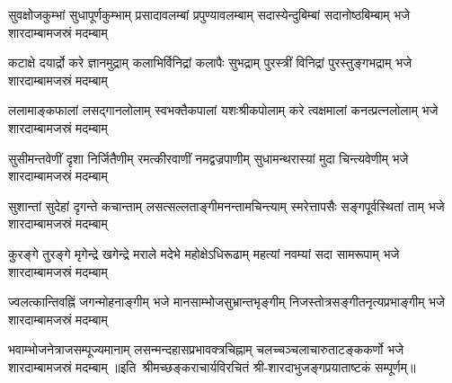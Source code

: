 

\fourlineindentedshloka
{सुवक्षोजकुम्भां सुधापूर्णकुम्भाम्}
{प्रसादावलम्बां प्रपुण्यावलम्बाम्}
{सदास्येन्दुबिम्बां सदानोष्ठबिम्बाम्}
{भजे शारदाम्बामजस्रं मदम्बाम्}

\fourlineindentedshloka
{कटाक्षे दयार्द्रो करे ज्ञानमुद्राम्}
{कलाभिर्विनिद्रां कलापैः सुभद्राम्}
{पुरस्त्रीं विनिद्रां पुरस्तुङ्गभद्राम्}
{भजे शारदाम्बामजस्रं मदम्बाम्}

\fourlineindentedshloka
{ललामाङ्कफालां लसद्गानलोलाम्}
{स्वभक्तैकपालां यशःश्रीकपोलाम्}
{करे त्वक्षमालां कनत्प्रत्नलोलाम्}
{भजे शारदाम्बामजस्रं मदम्बाम्}

\fourlineindentedshloka
{सुसीमन्तवेणीं दृशा निर्जितैणीम्}
{रमत्कीरवाणीं नमद्वज्रपाणीम्}
{सुधामन्थरास्यां मुदा चिन्त्यवेणीम्}
{भजे शारदाम्बामजस्रं मदम्बाम्}

\fourlineindentedshloka
{सुशान्तां सुदेहां दृगन्ते कचान्ताम्}
{लसत्सल्लताङ्गीमनन्तामचिन्त्याम्}
{स्मरेत्तापसैः सङ्गपूर्वस्थितां ताम्}
{भजे शारदाम्बामजस्रं मदम्बाम्}

\fourlineindentedshloka
{कुरङ्गे तुरङ्गे मृगेन्द्रे खगेन्द्रे}
{मराले मदेभे महोक्षेऽधिरूढाम्}
{महत्यां नवम्यां सदा सामरूपाम्}
{भजे शारदाम्बामजस्रं मदम्बाम्}

\fourlineindentedshloka
{ज्वलत्कान्तिवह्निं जगन्मोहनाङ्गीम्}
{भजे मानसाम्भोजसुभ्रान्तभृङ्गीम्}
{निजस्तोत्रसङ्गीतनृत्यप्रभाङ्गीम्}
{भजे शारदाम्बामजस्रं मदम्बाम्}

\fourlineindentedshloka
{भवाम्भोजनेत्राजसम्पूज्यमानाम्}
{लसन्मन्दहासप्रभावक्त्रचिह्नाम्}
{चलच्चञ्चलाचारुताटङ्ककर्णो}
{भजे शारदाम्बामजस्रं मदम्बाम्}
॥इति~श्रीमच्छङ्कराचार्यविरचितं श्री-शारदाभुजङ्गप्रयाताष्टकं सम्पूर्णम्॥